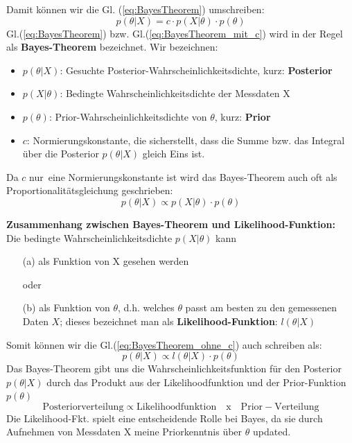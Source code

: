 Damit können wir die Gl. (\ref{eq:BayesTheorem}) umschreiben: 
\begin{equation}
p(\theta | X) = c \cdot p(X|\theta) \cdot p(\theta)
\label{eq:BayesTheorem_mit_c}
\end{equation}
Gl.(\ref{eq:BayesTheorem}) bzw. Gl.(\ref{eq:BayesTheorem_mit_c})  wird in der Regel als \textbf{Bayes-Theorem} bezeichnet. 
Wir bezeichnen: 
\begin{itemize}
	\item $p(\theta| X)$: Gesuchte Posterior-Wahrscheinlichkeitsdichte, kurz: 
	\textbf{Posterior}
	\item $p(X |\theta)$: Bedingte Wahrscheinlichkeitsdichte der Messdaten X
	\item $p(\theta)$: Prior-Wahrscheinlichkeitsdichte von $\theta$, kurz: \textbf{Prior}
	\item $c$: Normierungskonstante, die sicherstellt, dass die Summe bzw. das 
	Integral über die Posterior $p(\theta|X)$ gleich Eins ist. 
\end{itemize}

Da $c$ \glqq nur\grqq ~eine Normierungskonstante ist wird das Bayes-Theorem auch oft 
als Proportionalitätsgleichung geschrieben: 
\begin{equation}
p(\theta | X) \propto  p(X|\theta) \cdot p(\theta)
\label{eq:BayesTheorem_ohne_c}
\end{equation}

\textbf{Zusammenhang zwischen Bayes-Theorem und Likelihood-Funktion:} \\
Die bedingte Wahrscheinlichkeitsdichte $p(X|\theta)$ kann 
\begin{itemize}
	\item[(a)] als Funktion von X gesehen werden
	\item[] oder
	\item[(b)] als Funktion  von $\theta$, d.h. welches $\theta$ passt am 
	besten zu den gemessenen Daten $X$; dieses bezeichnet man als \textbf{Likelihood-Funktion}: $l(\theta|X)$ 
\end{itemize}

Somit können wir die Gl.(\ref{eq:BayesTheorem_ohne_c}) auch schreiben als: 
\begin{equation}
p(\theta | X) \propto  l(\theta|X) \cdot p(\theta)
\label{eq:BayesTheorem_mit_Likelihood}
\end{equation}
Das Bayes-Theorem gibt uns die Wahrscheinlichkeitsfunktion für den Posterior 
$p(\theta|X)$  durch das Produkt aus der Likelihoodfunktion und der
Prior-Funktion $p(\theta)$
\[ 
\mathrm{Posteriorverteilung} \propto \mathrm{Likelihoodfunktion} \quad 
\mathrm{x} \quad 
\mathrm{Prior-Verteilung}
 \]
Die Likelihood-Fkt. spielt eine entscheidende Rolle bei Bayes, da sie durch Aufnehmen von Messdaten X meine Priorkenntnis über $\theta$
updated. 

